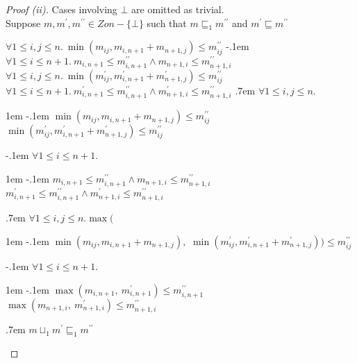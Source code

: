 \begin{prop}
  \begin{proof}[Proof (ii)]
    Cases involving $\bot$ are omitted as trivial.\\
    \noindent
    Suppose $m,m^\prime,m^{\prime\prime}\in\mathit{Zon}-\{\bot\}$ such that $m\sqsubseteq_1 m^{\prime\prime}$ and $m^\prime\sqsubseteq m^{\prime\prime}$
    \begin{itemize}
      \step[\imps] $\forall1\leq i, j\leq n.~\min(m_{ij},m_{i,n+1}+m_{n+1,j})\leq m^{\prime\prime}_{ij}$
      \itemsep-.1em
      \step[\wedge] $\forall1\leq i\leq n+1.~m_{i,n+1}\leq m^{\prime\prime}_{i,n+1}\wedge m_{n+1,i}\leq m^{\prime\prime}_{n+1,i}$
      \step[\wedge] $\forall1\leq i, j\leq n.~\min(m^\prime_{ij},m^\prime_{i,n+1}+m^\prime_{n+1,j})\leq m^{\prime\prime}_{ij}$
      \step[\wedge] $\forall1\leq i\leq n+1.~m^\prime_{i,n+1}\leq m^{\prime\prime}_{i,n+1}\wedge m^\prime_{n+1,i}\leq m^{\prime\prime}_{n+1,i}$
      \itemsep.7em
      \step[\imps] $\forall1\leq i, j\leq n.$
      \begin{itemize}
        \itemindent1em
        \itemsep-.1em
        \step $\min(m_{ij},m_{i,n+1}+m_{n+1,j})\leq m^{\prime\prime}_{ij}$
        \step[\wedge] $\min(m^\prime_{ij},m^\prime_{i,n+1}+m^\prime_{n+1,j})\leq m^{\prime\prime}_{ij}$
      \end{itemize}
      \itemsep-.1em
      \step[\wedge] $\forall1\leq i\leq n+1.$
      \begin{itemize}
        \itemindent1em
        \itemsep-.1em
        \step $m_{i,n+1}\leq m^{\prime\prime}_{i,n+1}\wedge m_{n+1,i}\leq m^{\prime\prime}_{n+1,i}$
        \step[\wedge] $m^\prime_{i,n+1}\leq m^{\prime\prime}_{i,n+1}\wedge m^\prime_{n+1,i}\leq m^{\prime\prime}_{n+1,i}$
      \end{itemize}
      \itemsep.7em
      \step[\imps] $\forall1\leq i, j\leq n. \max($
      \begin{itemize}
        \itemindent1em
        \itemsep-.1em
        \step $\min(m_{ij},m_{i,n+1}+m_{n+1,j}),$
        \step $\min(m^\prime_{ij},m^\prime_{i,n+1}+m^\prime_{n+1,j}))\leq m^{\prime\prime}_{ij}$
      \end{itemize}
      \itemsep-.1em
      \step[\wedge] $\forall1\leq i\leq n+1.$
      \begin{itemize}
        \itemindent1em
        \itemsep-.1em
        \step $\max(m_{i,n+1},~m^\prime_{i,n+1})\leq m^{\prime\prime}_{i,n+1}$
        \step[\wedge] $\max(m_{n+1,i},~m^\prime_{n+1,i})\leq m^{\prime\prime}_{n+1,i}$
      \end{itemize}
      \itemsep.7em
      \step[\iffs] $m\sqcup_1m^\prime\sqsubseteq_1m^{\prime\prime}$\qedhere
    \end{itemize}
  \end{proof}
\end{prop}
